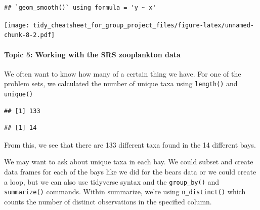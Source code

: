 \documentclass[
]{article}
\newenvironment{Shaded}{\begin{snugshade}}{\end{snugshade}}
\newcommand{\CommentTok}[1]{\textcolor[rgb]{0.56,0.35,0.01}{\textit{#1}}}
\newcommand{\FunctionTok}[1]{\textcolor[rgb]{0.13,0.29,0.53}{\textbf{#1}}}
\newcommand{\NormalTok}[1]{#1}
\newcommand{\OtherTok}[1]{\textcolor[rgb]{0.56,0.35,0.01}{#1}}
\newcommand{\SpecialCharTok}[1]{\textcolor[rgb]{0.81,0.36,0.00}{\textbf{#1}}}
\newcommand{\StringTok}[1]{\textcolor[rgb]{0.31,0.60,0.02}{#1}}
\begin{document}
\begin{verbatim}
## `geom_smooth()` using formula = 'y ~ x'
\end{verbatim}

\texttt{[image: tidy\_cheatsheet\_for\_group\_project\_files/figure-latex/unnamed-chunk-8-2.pdf]}

\hypertarget{topic-5-working-with-the-srs-zooplankton-data}{%
\paragraph{Topic 5: Working with the SRS zooplankton
data}\label{topic-5-working-with-the-srs-zooplankton-data}}

We often want to know how many of a certain thing we have. For one of
the problem sets, we calculated the number of unique taxa using
\texttt{length()} and \texttt{unique()}

\begin{Shaded}
\end{Shaded}

\begin{verbatim}
## [1] 133
\end{verbatim}

\begin{Shaded}
\end{Shaded}

\begin{verbatim}
## [1] 14
\end{verbatim}

From this, we see that there are 133 different taxa found in the 14
different bays.

We may want to ask about unique taxa in each bay. We could subset and
create data frames for each of the bays like we did for the bears data
or we could create a loop, but we can also use tidyverse syntax and the
\texttt{group\_by()} and \texttt{summarize()} commands. Within
summarize, we're using \texttt{n\_distinct()} which counts the number of
distinct observations in the specified column.
\end{document}
